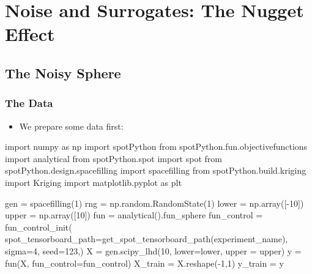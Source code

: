 \documentclass[
  letterpaper,
  DIV=11,
  numbers=noendperiod]{scrreprt}
\newenvironment{Shaded}{\begin{snugshade}}{\end{snugshade}}
\newcommand{\DecValTok}[1]{\textcolor[rgb]{0.68,0.00,0.00}{#1}}
\newcommand{\ImportTok}[1]{\textcolor[rgb]{0.00,0.46,0.62}{#1}}
\newcommand{\NormalTok}[1]{\textcolor[rgb]{0.00,0.23,0.31}{#1}}
\newcommand{\OperatorTok}[1]{\textcolor[rgb]{0.37,0.37,0.37}{#1}}
\providecommand{\tightlist}{%
  \setlength{\itemsep}{0pt}\setlength{\parskip}{0pt}}\usepackage{longtable,booktabs,array}
\begin{document}
\hypertarget{noise-and-surrogates-the-nugget-effect}{%
\section{Noise and Surrogates: The Nugget
Effect}\label{noise-and-surrogates-the-nugget-effect}}

\hypertarget{the-noisy-sphere}{%
\subsection{The Noisy Sphere}\label{the-noisy-sphere}}

\hypertarget{the-data}{%
\subsubsection{The Data}\label{the-data}}

\begin{itemize}
\tightlist
\item
  We prepare some data first:
\end{itemize}

\begin{Shaded}
\begin{Highlighting}[]
\ImportTok{import}\NormalTok{ numpy }\ImportTok{as}\NormalTok{ np}
\ImportTok{import}\NormalTok{ spotPython}
\ImportTok{from}\NormalTok{ spotPython.fun.objectivefunctions }\ImportTok{import}\NormalTok{ analytical}
\ImportTok{from}\NormalTok{ spotPython.spot }\ImportTok{import}\NormalTok{ spot}
\ImportTok{from}\NormalTok{ spotPython.design.spacefilling }\ImportTok{import}\NormalTok{ spacefilling}
\ImportTok{from}\NormalTok{ spotPython.build.kriging }\ImportTok{import}\NormalTok{ Kriging}
\ImportTok{import}\NormalTok{ matplotlib.pyplot }\ImportTok{as}\NormalTok{ plt}

\NormalTok{gen }\OperatorTok{=}\NormalTok{ spacefilling(}\DecValTok{1}\NormalTok{)}
\NormalTok{rng }\OperatorTok{=}\NormalTok{ np.random.RandomState(}\DecValTok{1}\NormalTok{)}
\NormalTok{lower }\OperatorTok{=}\NormalTok{ np.array([}\OperatorTok{{-}}\DecValTok{10}\NormalTok{])}
\NormalTok{upper }\OperatorTok{=}\NormalTok{ np.array([}\DecValTok{10}\NormalTok{])}
\NormalTok{fun }\OperatorTok{=}\NormalTok{ analytical().fun\_sphere}
\NormalTok{fun\_control }\OperatorTok{=}\NormalTok{ fun\_control\_init(}
\NormalTok{    spot\_tensorboard\_path}\OperatorTok{=}\NormalTok{get\_spot\_tensorboard\_path(experiment\_name),}
\NormalTok{    sigma}\OperatorTok{=}\DecValTok{4}\NormalTok{,}
\NormalTok{    seed}\OperatorTok{=}\DecValTok{123}\NormalTok{,)}
\NormalTok{X }\OperatorTok{=}\NormalTok{ gen.scipy\_lhd(}\DecValTok{10}\NormalTok{, lower}\OperatorTok{=}\NormalTok{lower, upper }\OperatorTok{=}\NormalTok{ upper)}
\NormalTok{y }\OperatorTok{=}\NormalTok{ fun(X, fun\_control}\OperatorTok{=}\NormalTok{fun\_control)}
\NormalTok{X\_train }\OperatorTok{=}\NormalTok{ X.reshape(}\OperatorTok{{-}}\DecValTok{1}\NormalTok{,}\DecValTok{1}\NormalTok{)}
\NormalTok{y\_train }\OperatorTok{=}\NormalTok{ y}
\end{Highlighting}
\end{Shaded}
\end{document}
